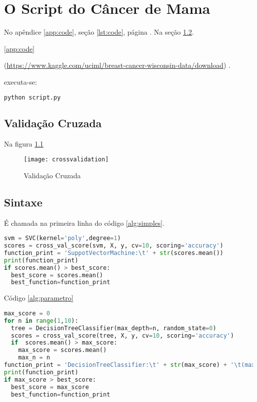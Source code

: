 \chapter{O Script do Câncer de Mama}
\label{chapter:o_script_do_cancer_de_mama}


No apêndice \ref{app:code}, seção
\ref{lst:code}, página \pageref{lst:code}.
Na seção \ref{sintaxe}.

\cite{PYTHON} 
\ref{app:code} 
  
(\url{https://www.kaggle.com/uciml/breast-cancer-wisconsin-data/download}) \cite{BREASTCANCER}.

executa-se:

\begin{lstlisting}[language=Python, caption=Executar Script.py]
python script.py
\end{lstlisting}

\section{Validação Cruzada}

Na figura \ref{fig:crossvalidation}

\begin{figure}[H]
\begin{center}
\caption{Validação Cruzada}
\texttt{[image: crossvalidation]}
\label{fig:crossvalidation}
\end{center}
\end{figure}

\section{Sintaxe}
\label{sintaxe}
É chamada na primeira linha do código \ref{alg:simples}.


\begin{lstlisting}[language=Python, caption=Sintaxe Simples, label=alg:simples]
svm = SVC(kernel='poly',degree=1)
scores = cross_val_score(svm, X, y, cv=10, scoring='accuracy')
function_print = 'SuppotVectorMachine:\t' + str(scores.mean())
print(function_print)
if scores.mean() > best_score:
  best_score = scores.mean()
  best_function=function_print
\end{lstlisting}

Código \ref{alg:parametro}

\begin{lstlisting}[language=Python, caption=Sintaxe com Parâmetro, label=alg:parametro]
max_score = 0
for n in range(1,10):
  tree = DecisionTreeClassifier(max_depth=n, random_state=0)
  scores = cross_val_score(tree, X, y, cv=10, scoring='accuracy')
  if  scores.mean() > max_score:
    max_score = scores.mean()
    max_n = n
function_print = 'DecisionTreeClassifier:\t' + str(max_score) + '\t(max_depth=' + str(max_n) + ')'
print(function_print)
if max_score > best_score:
  best_score = max_score
  best_function=function_print
\end{lstlisting}

